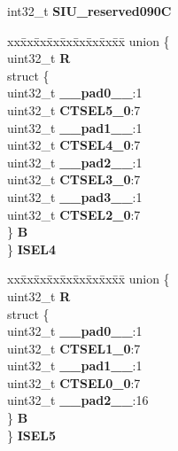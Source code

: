 \begin{DoxyCompactItemize}
\begin{tabbing}
\end{tabbing}\item 
\mbox{\label{structSIU__tag_a9df688b88cb68e05ce4c56e9730f28da}} 
int32\+\_\+t {\bfseries S\+I\+U\+\_\+reserved090C}
\item 
\mbox{\label{structSIU__tag_ad28806a4e57e8bc8836eb07da115d68a}} 
\begin{tabbing}
xx\=xx\=xx\=xx\=xx\=xx\=xx\=xx\=xx\=\kill
union \{\\
\>uint32\_t {\bfseries R}\\
\>struct \{\\
\>\>uint32\_t {\bfseries \_\_pad0\_\_}:1\\
\>\>uint32\_t {\bfseries CTSEL5\_0}:7\\
\>\>uint32\_t {\bfseries \_\_pad1\_\_}:1\\
\>\>uint32\_t {\bfseries CTSEL4\_0}:7\\
\>\>uint32\_t {\bfseries \_\_pad2\_\_}:1\\
\>\>uint32\_t {\bfseries CTSEL3\_0}:7\\
\>\>uint32\_t {\bfseries \_\_pad3\_\_}:1\\
\>\>uint32\_t {\bfseries CTSEL2\_0}:7\\
\>\} {\bfseries B}\\
\} {\bfseries ISEL4}\\

\end{tabbing}\item 
\mbox{\label{structSIU__tag_ab644377ad277eb7e1248c12c01691ca0}} 
\begin{tabbing}
xx\=xx\=xx\=xx\=xx\=xx\=xx\=xx\=xx\=\kill
union \{\\
\>uint32\_t {\bfseries R}\\
\>struct \{\\
\>\>uint32\_t {\bfseries \_\_pad0\_\_}:1\\
\>\>uint32\_t {\bfseries CTSEL1\_0}:7\\
\>\>uint32\_t {\bfseries \_\_pad1\_\_}:1\\
\>\>uint32\_t {\bfseries CTSEL0\_0}:7\\
\>\>uint32\_t {\bfseries \_\_pad2\_\_}:16\\
\>\} {\bfseries B}\\
\} {\bfseries ISEL5}\\


\end{tabbing}
\end{DoxyCompactItemize}
